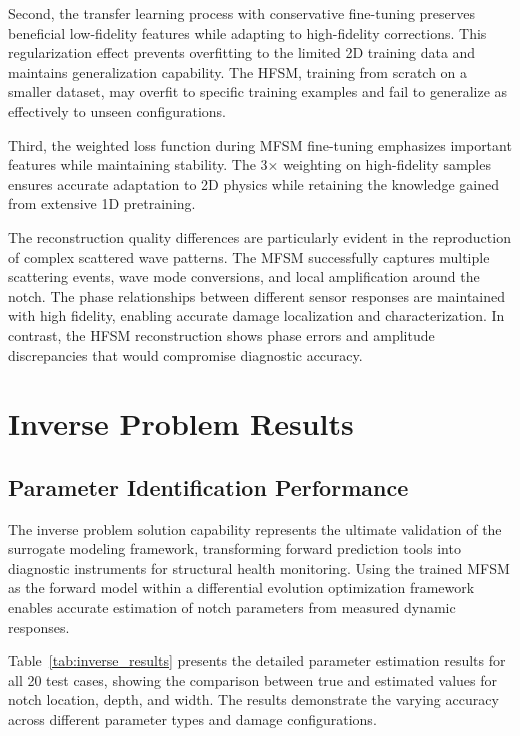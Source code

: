 \documentclass[12pt,a4paper]{report}
\begin{document}
Second, the transfer learning process with conservative fine-tuning preserves beneficial low-fidelity features while adapting to high-fidelity corrections. This regularization effect prevents overfitting to the limited 2D training data and maintains generalization capability. The HFSM, training from scratch on a smaller dataset, may overfit to specific training examples and fail to generalize as effectively to unseen configurations.

Third, the weighted loss function during MFSM fine-tuning emphasizes important features while maintaining stability. The 3× weighting on high-fidelity samples ensures accurate adaptation to 2D physics while retaining the knowledge gained from extensive 1D pretraining.

The reconstruction quality differences are particularly evident in the reproduction of complex scattered wave patterns. The MFSM successfully captures multiple scattering events, wave mode conversions, and local amplification around the notch. The phase relationships between different sensor responses are maintained with high fidelity, enabling accurate damage localization and characterization. In contrast, the HFSM reconstruction shows phase errors and amplitude discrepancies that would compromise diagnostic accuracy.


\section{Inverse Problem Results}

\subsection{Parameter Identification Performance}

The inverse problem solution capability represents the ultimate validation of the surrogate modeling framework, transforming forward prediction tools into diagnostic instruments for structural health monitoring. Using the trained MFSM as the forward model within a differential evolution optimization framework enables accurate estimation of notch parameters from measured dynamic responses.

Table~\ref{tab:inverse_results} presents the detailed parameter estimation results for all 20 test cases, showing the comparison between true and estimated values for notch location, depth, and width. The results demonstrate the varying accuracy across different parameter types and damage configurations.
\end{document}
